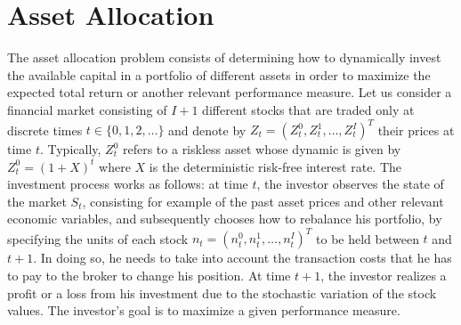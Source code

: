 \chapter{Asset Allocation}

The asset allocation problem consists of determining how to dynamically invest
the available capital in a portfolio of different assets in order to maximize
the expected total return or another relevant performance measure. Let us
consider a financial market consisting of $I+1$ different stocks that are
traded only at discrete times $t \in \{0, 1, 2, \ldots\}$ and denote by
${Z}_t = {(Z_t^0, Z_t^1, \ldots, Z_t^I)}^T$ their prices at time $t$.
Typically, $Z_t^0$ refers to a riskless asset whose dynamic is given by $Z_t^0
= {(1 + X)}^t$ where $X$ is the deterministic risk-free interest rate. The
investment process works as follows: at time $t$, the investor observes the
state of the market $S_t$, consisting for example of the past asset prices and
other relevant economic variables, and subsequently chooses how to rebalance
his portfolio, by specifying the units of each stock ${n}_t = {(n_t^0 ,
n_t^1 , \ldots , n_t^I)}^T$ to be held between $t$ and $t+1$. In doing so, he
needs to take into account the transaction costs that he has to pay to the
broker to change his position.  At time $t+1$, the investor realizes a profit
or a loss from his investment due to the stochastic variation of the stock
values. The investor’s goal is to maximize a given performance measure.

